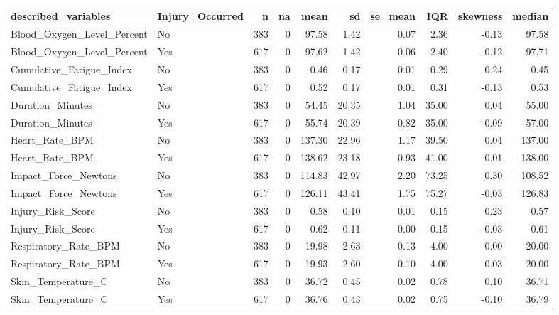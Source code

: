 \documentclass[
]{article}
\begin{document}
\begin{table}

\centering
\begin{tabular}[t]{l|l|r|r|r|r|r|r|r|r}
\hline
described\_variables & Injury\_Occurred & n & na & mean & sd & se\_mean & IQR & skewness & median\\
\hline
Blood\_Oxygen\_Level\_Percent & No & 383 & 0 & 97.58 & 1.42 & 0.07 & 2.36 & -0.13 & 97.58\\
\hline
Blood\_Oxygen\_Level\_Percent & Yes & 617 & 0 & 97.62 & 1.42 & 0.06 & 2.40 & -0.12 & 97.71\\
\hline
Cumulative\_Fatigue\_Index & No & 383 & 0 & 0.46 & 0.17 & 0.01 & 0.29 & 0.24 & 0.45\\
\hline
Cumulative\_Fatigue\_Index & Yes & 617 & 0 & 0.52 & 0.17 & 0.01 & 0.31 & -0.13 & 0.53\\
\hline
Duration\_Minutes & No & 383 & 0 & 54.45 & 20.35 & 1.04 & 35.00 & 0.04 & 55.00\\
\hline
Duration\_Minutes & Yes & 617 & 0 & 55.74 & 20.39 & 0.82 & 35.00 & -0.09 & 57.00\\
\hline
Heart\_Rate\_BPM & No & 383 & 0 & 137.30 & 22.96 & 1.17 & 39.50 & 0.04 & 137.00\\
\hline
Heart\_Rate\_BPM & Yes & 617 & 0 & 138.62 & 23.18 & 0.93 & 41.00 & 0.01 & 138.00\\
\hline
Impact\_Force\_Newtons & No & 383 & 0 & 114.83 & 42.97 & 2.20 & 73.25 & 0.30 & 108.52\\
\hline
Impact\_Force\_Newtons & Yes & 617 & 0 & 126.11 & 43.41 & 1.75 & 75.27 & -0.03 & 126.83\\
\hline
Injury\_Risk\_Score & No & 383 & 0 & 0.58 & 0.10 & 0.01 & 0.15 & 0.23 & 0.57\\
\hline
Injury\_Risk\_Score & Yes & 617 & 0 & 0.62 & 0.11 & 0.00 & 0.15 & -0.03 & 0.61\\
\hline
Respiratory\_Rate\_BPM & No & 383 & 0 & 19.98 & 2.63 & 0.13 & 4.00 & 0.00 & 20.00\\
\hline
Respiratory\_Rate\_BPM & Yes & 617 & 0 & 19.93 & 2.60 & 0.10 & 4.00 & 0.03 & 20.00\\
\hline
Skin\_Temperature\_C & No & 383 & 0 & 36.72 & 0.45 & 0.02 & 0.78 & 0.10 & 36.71\\
\hline
Skin\_Temperature\_C & Yes & 617 & 0 & 36.76 & 0.43 & 0.02 & 0.75 & -0.10 & 36.79\\
\hline
\end{tabular}
\end{table}
\end{document}
